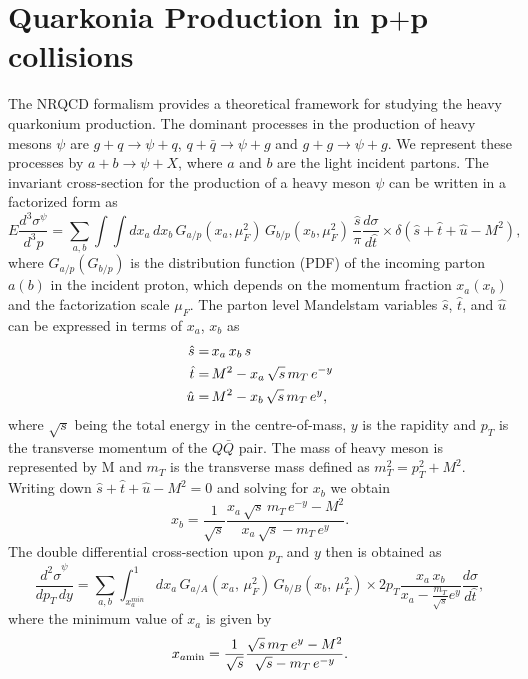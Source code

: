 \documentclass[aps,prc,preprint,superscriptaddress,showpacs,showkeys,amsmath]{revtex4-1}
\begin{document}
\section{Quarkonia Production in p$+$p collisions}
\label{section:ppProduction}
 The NRQCD formalism provides a theoretical framework for studying the heavy 
quarkonium production. The dominant processes in the production of heavy 
mesons $\psi$ are $g+q\rightarrow \psi+q$, $q+\bar{q}\rightarrow \psi+g$ and 
$g+g\rightarrow \psi+g$. We represent these processes by $a+b\rightarrow \psi+X$, 
where $a$ and $b$ are the light incident partons. The invariant cross-section 
for the production of a heavy meson $\psi$ can be written in a factorized form as 
\begin{equation}
    E\frac{d^{3}\sigma^{\psi}}{d^{3}p} = \sum_{a,b}\int \int dx_a\,dx_b \, 
    G_{a/p}(x_a,\mu_{F}^{2}) \, G_{b/p}(x_b,\mu_{F}^{2}) \, \frac{\hat s}{\pi}\frac{d\sigma}{d\hat t}
    \times \delta(\hat s + \hat t + \hat u -M^{2}), 
\label{eqn:cross}
\end{equation}
where $G_{a/p}(G_{b/p})$ is the distribution function (PDF) of the incoming parton 
$a(b)$ in the incident proton, which depends on the momentum fraction $x_a(x_b)$
and the factorization scale $\mu_F$. The parton level  Mandelstam variables 
${\hat s}$, ${\hat t}$, and ${\hat u}$
can be expressed in terms of $x_a$, $x_b$ as 
\begin{equation}
\begin{split}
{\hat{s}} = \,& x_{a}\,x_{b}\,s \\
{\hat{t}} = \,& M^{2} - x_{a}\,\sqrt{s}\,m_{T}\,e^{-y}\\
{\hat{u}} = \,& M^{2} - x_{b}\,\sqrt{s}\,m_{T}\,e^{y} ,
\end{split}  
\end{equation}
where $\sqrt{s}$ being the total energy in the centre-of-mass, $y$ is the rapidity 
and $p_{T}$ is the transverse momentum of the $Q\bar Q$ pair. The mass of heavy
meson is represented by M and $m_{T}$ is the transverse mass 
defined as $m_{T}^{2} = p_{T}^{2} + M^{2}$. Writing 
down $ \hat s + \hat t + \hat u -M^{2} = 0$ and solving for $x_{b}$ we obtain
\begin{equation}
x_b = \frac{1}{\sqrt{s}}\frac{x_a\,\sqrt{s}\,m_T\,e^{-y}-M^2}{x_a\,\sqrt{s}-m_T\,e^y}.
\end{equation}
 The double differential cross-section upon $p_{T}$ and $y$ then is obtained as
\begin{equation}
\frac{{d^{2}\sigma}^{\psi}}{dp_T\,dy} = \sum_{a,b}\int_{x_{a}^{min}}^{1} dx_a\, 
           G_{a/A}(x_a,\,\mu^{2}_{F})\, G_{b/B}(x_b,\,\mu^{2}_{F})\times 
            2p_T \frac{x_a\,x_b}{x_a-\frac{m_T}{\sqrt{s}}e^y}\frac{d\sigma}{d\hat t},
\end{equation}
where the minimum value of $x_a$ is given by
\begin{equation}
x_{a\rm min} = \frac{1}{\sqrt{s}}\frac{\sqrt{s}\,m_T\,e^{y}-M^2}{\sqrt{s}-m_T\,e^{-y}}.
\end{equation}
\end{document}
